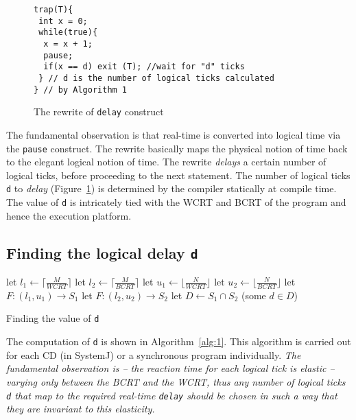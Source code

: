 \begin{figure}[tb]
    \begin{minipage}{\textwidth}
      \begin{scriptsize}
\begin{verbatim}
trap(T){
 int x = 0;
 while(true){
  x = x + 1;
  pause;
  if(x == d) exit (T); //wait for "d" ticks
 } // d is the number of logical ticks calculated
} // by Algorithm 1
\end{verbatim}
      \end{scriptsize}
    \end{minipage}
    \caption{The rewrite of \texttt{delay} construct}
    \label{fig:3}
\end{figure}

The fundamental observation is that real-time is converted into logical
time via the \texttt{pause} construct. The rewrite basically maps the
physical notion of time back to the elegant logical notion of time. The
rewrite \textit{delays} a certain number of logical ticks, before
proceeding to the next statement. The number of logical ticks \texttt{d}
to \textit{delay} (Figure~\ref{fig:3}) is determined by the compiler
statically at compile time. The value of \texttt{d} is intricately tied
with the WCRT and BCRT of the program and hence the execution platform.

\subsection{Finding the logical delay \texttt{d}}
\label{sec:find-logic-delay}

\begin{algorithm}[t!]
  \begin{minipage}{1.0\linewidth}
    \SetAlgoLined
    let $l_1 \leftarrow \lceil \frac{M}{WCRT} \rceil$\;
    let $l_2 \leftarrow \lceil \frac{M}{BCRT} \rceil$\;
    let $u_1 \leftarrow \lfloor \frac{N}{WCRT} \rfloor$\;
    let $u_2 \leftarrow \lfloor \frac{N}{BCRT} \rfloor$\;
    let $F:(l_1,u_1) \rightarrow S_1$\;
    let $F:(l_2,u_2) \rightarrow S_2$\;
    let $D \leftarrow S_1 \cap S_2$\;
    \Return (some $d \in D$)\;
    \caption{Finding the value of \texttt{d}}
    \label{alg:1}
  \end{minipage}
\end{algorithm}

The computation of \texttt{d} is shown in Algorithm~\ref{alg:1}. This
algorithm is carried out for each CD (in SystemJ) or a synchronous
program individually. \textit{The fundamental observation is -- the
  reaction time for each logical tick is elastic -- varying only between
  the BCRT and the WCRT, thus any number of logical ticks \texttt{d}
  that map to the required real-time \texttt{delay} should be chosen in
  such a way that they are invariant to this elasticity.}

